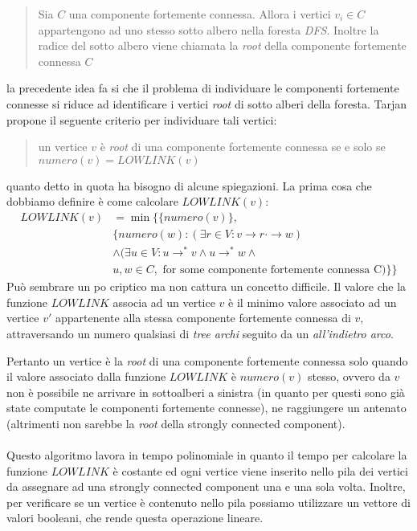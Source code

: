 \begin{quotation}
  Sia $C$ una componente fortemente connessa. Allora i vertici $v_{i}
  \in C$ appartengono ad uno stesso sotto albero nella foresta
  \emph{DFS}. Inoltre la radice del sotto albero viene chiamata la
  \emph{root} della componente fortemente connessa $C$
\end{quotation}
la precedente idea fa si che il problema di individuare le componenti
fortemente connesse si riduce ad identificare i vertici \emph{root} di
sotto alberi della foresta. Tarjan propone il seguente criterio per
individuare tali vertici:
\begin{quotation}
  un vertice $v$ \`e \emph{root} di una componente fortemente connessa
  se e solo se $numero(v) = LOWLINK(v)$ 
\end{quotation}
quanto detto in quota ha bisogno di alcune spiegazioni. La prima cosa
che dobbiamo definire \`e come calcolare $LOWLINK(v)$:
\begin{displaymath}
  \begin{split}
    LOWLINK(v) &= \min\{\{numero(v)\}, \\
    & \{numero(w): (\exists r \in V: v \rightarrow r \cdot\rightarrow w) \\
    & \wedge (\exists u \in V: u \rightarrow^{*} v \wedge u
    \rightarrow^{*} w \wedge \\
    & u,w \in C, \text{ for some componente fortemente connessa C}) \}\}
  \end{split}
\end{displaymath}
Pu\`o sembrare un po criptico ma non cattura un concetto difficile. Il
valore che la funzione $LOWLINK$ associa ad un vertice $v$ \`e il
minimo valore associato ad un vertice $v'$ appartenente alla stessa
componente fortemente connessa di $v$, attraversando un numero qualsiasi
di \emph{tree archi} seguito da un \emph{all'indietro arco}.

Pertanto un vertice \`e la \emph{root} di una componente fortemente connessa solo quando il valore associato dalla funzione $LOWLINK$ \`e
$numero(v)$ stesso, ovvero da $v$ non \`e possibile ne arrivare in
sottoalberi a sinistra (in quanto per questi sono gi\`a state
computate le componenti fortemente connesse), ne raggiungere un
antenato (altrimenti non sarebbe la \emph{root} della strongly
connected component).
\\\\
Questo algoritmo lavora in tempo polinomiale in quanto il tempo per
calcolare la funzione $LOWLINK$ \`e costante ed ogni vertice viene
inserito nello pila dei vertici da assegnare ad una strongly
connected component una e una sola volta. Inoltre, per verificare se
un vertice \`e contenuto nello pila possiamo utilizzare un vettore di
valori booleani, che rende questa operazione lineare.

